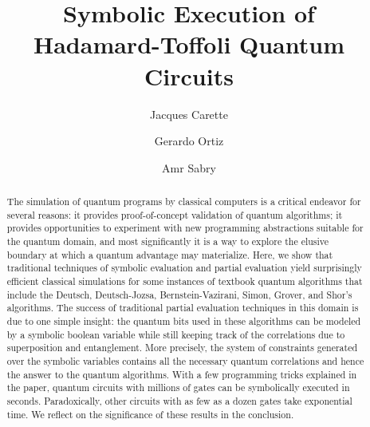 \documentclass[sigplan,review]{acmart}
\theoremstyle{definition}
\begin{document}
\title[Symbolic Quantum Execution]{Symbolic Execution of \\
  Hadamard-Toffoli Quantum Circuits}

\author{Jacques Carette}

\author{Gerardo Ortiz}

\author{Amr Sabry}

\begin{abstract}
  The simulation of quantum programs by classical computers is a critical endeavor
  for several reasons: it provides proof-of-concept validation of
  quantum algorithms; it provides opportunities to experiment with new
  programming abstractions suitable for the quantum domain, and most
  significantly it is a way to explore the elusive boundary at which a
  quantum advantage may materialize. Here, we show that traditional
  techniques of symbolic evaluation and partial evaluation yield
  surprisingly efficient classical simulations for some instances of
  textbook quantum algorithms that include the Deutsch, Deutsch-Jozsa,
  Bernstein-Vazirani, Simon, Grover, and Shor's algorithms. The success
  of traditional partial evaluation techniques in this domain is due
  to one simple insight: the quantum bits used in these algorithms can
  be modeled by a symbolic boolean variable while still keeping track
  of the correlations due to superposition and entanglement. More
  precisely, the system of constraints generated over the symbolic
  variables contains all the necessary quantum correlations and hence
  the answer to the quantum algorithms. With a few programming tricks
  explained in the paper, quantum circuits with millions of gates can
  be symbolically executed in seconds. Paradoxically, other circuits
  with as few as a dozen gates take exponential time. We reflect on
  the significance of these results in the conclusion.   
\end{abstract} 

\maketitle 

\end{document}
